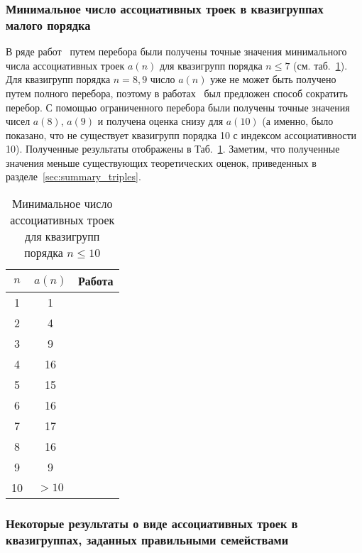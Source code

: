 \subsubsection{Минимальное число ассоциативных троек в квазигруппах малого порядка}
    В ряде работ~\cite{ass_summary, groek11, valent16} путем перебора были получены точные значения минимального числа ассоциативных троек $a(n)$ для квазигрупп порядка $n \le 7$ (см. таб.~\ref{tab:assoctriples}).
    Для квазигрупп порядка $n = 8, 9$ число $a(n)$ уже не может быть получено путем полного перебора, поэтому в работах~\cite{valent2018small, drapal2019high, drapal2020extreme} был предложен способ сократить перебор.
    С помощью ограниченного перебора были получены точные значения чисел $a(8)$, $a(9)$ и получена оценка снизу для $a(10)$ (а именно, было показано, что не существует квазигрупп порядка 10 с индексом ассоциативности 10).
    Полученные результаты отображены в Таб.~\ref{tab:assoctriples}.
    Заметим, что полученные значения меньше существующих теоретических оценок, приведенных в разделе~\ref{sec:summary_triples}.
    \begin{table}
        \centering
        \captionsetup{justification=centering} %
        \caption{\label{tab:assoctriples} Минимальное число ассоциативных троек для квазигрупп порядка $n \le 10$}
        \begin{tabular}{c|c|c}
            $n$ & $a(n)$ & Работа \\ 
            \toprule
            1 & 1  & \cite{ass_summary} \\
            2 & 4  & \cite{ass_summary} \\
            3 & 9  & \cite{ass_summary} \\
            4 & 16 & \cite{ass_summary} \\
            5 & 15 & \cite{ass_summary} \\
            6 & 16 & \cite{ass_summary} \\
            7 & 17 & \cite{valent16} \\
            8 & 16 & \cite{drapal2019high} \\
            9 & 9  & \cite{valent2018small}  \\
            10 & $>10$ & \cite{drapal2020extreme} \\
            \bottomrule
        \end{tabular}
    \end{table}

\subsubsection{Некоторые результаты о виде ассоциативных троек в квазигруппах, заданных правильными семействами}
\label{sec:assoctriples_proper}

